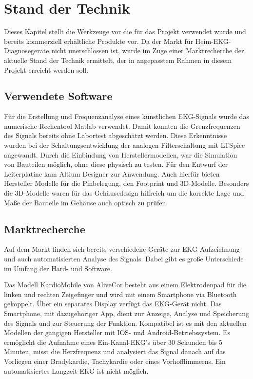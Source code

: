 
\section{Stand der Technik}

Dieses Kapitel stellt die Werkzeuge vor die für das Projekt verwendet wurde und bereits kommerziell erhältliche Produkte vor. Da der Markt für Heim-EKG-Diagnosegeräte nicht unerschlossen ist, wurde im Zuge einer Marktrecherche der aktuelle Stand der Technik ermittelt, der in angepasstem Rahmen in diesem Projekt erreicht werden soll. 

\subsection{Verwendete Software}

Für die Erstellung und Frequenzanalyse eines künstlichen EKG-Signals wurde das numerische Rechentool Matlab verwendet. Damit konnten die Grenzfrequenzen des Signals bereits ohne Labortest abgeschätzt werden. Diese Erkenntnisse wurden bei der Schaltungsentwicklung der analogen Filterschaltung mit LTSpice angewandt. Durch die Einbindung von Herstellermodellen, war die Simulation von Bauteilen möglich, ohne diese physisch zu testen. Für den Entwurf der Leiterplatine kam Altium Designer zur Anwendung. Auch hierfür bieten Hersteller Modelle für die Pinbelegung, den Footprint und 3D-Modelle. Besonders die 3D-Modelle waren für das Gehäusedesign hilfreich um die korrekte Lage und Maße der Bauteile im Gehäuse auch optisch zu prüfen.

\subsection{Marktrecherche}

Auf dem Markt finden sich bereits verschiedene Geräte zur EKG-Aufzeichnung und auch automatisierten Analyse des Signals. Dabei gibt es große Unterschiede im Umfang der Hard- und Software.

Das Modell KardioMobile von AliveCor besteht aus einem Elektrodenpad für die linken und rechten Zeigefinger und wird mit einem Smartphone via Bluetooth gekoppelt. Über ein separates Display verfügt das EKG-Gerät nicht. Das Smartphone, mit dazugehöriger App, dient zur Anzeige, Analyse und Speicherung des Signals und zur Steuerung der Funktion. Kompatibel ist es mit den aktuellen Modellen der gängigen Hersteller mit IOS- und Android-Betriebssystem. Es ermöglicht die Aufnahme eines Ein-Kanal-EKG's über 30 Sekunden bis 5 Minuten, misst die Herzfrequenz und analysiert das Signal danach auf das Vorliegen einer Bradykardie, Tachykardie oder eines Vorhofflimmerns. Ein automatisiertes Langzeit-EKG ist nicht möglich. 

